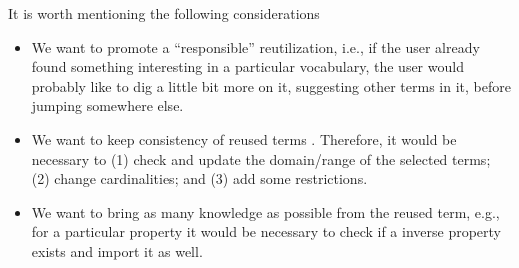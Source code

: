 It is worth mentioning the following considerations
\begin{itemize}
	\item We want to promote a ``responsible'' reutilization, i.e., if the user already found something interesting in a particular vocabulary, the user would probably like to dig a little bit more on it, suggesting other terms in it, before jumping somewhere else.
	\item We want to keep consistency of reused terms . Therefore, it would be necessary to (1) check and update the domain/range of the selected terms; (2) change cardinalities; and (3) add some restrictions.
	\item We want to bring as many knowledge as possible from the reused term, e.g., for a particular property it would be necessary to check if a inverse property exists and import it as well.
\end{itemize} 